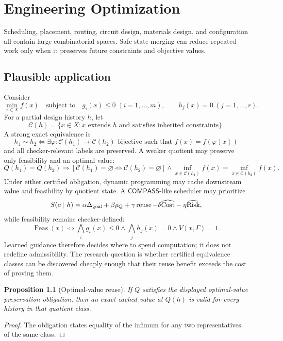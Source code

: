 \documentclass[11pt,oneside]{book}
\newtheorem{proposition}[theorem]{Proposition}
\theoremstyle{definition}
\theoremstyle{remark}
\newcommand{\COMPASS}{\mathsf{COMPASS}}
\newcommand{\Cost}{\operatorname{Cost}}
\newcommand{\Risk}{\operatorname{Risk}}
\begin{document}
\chapter{Engineering Optimization}
\label{ch:engineering}

Scheduling, placement, routing, circuit design, materials design, and configuration all contain large
combinatorial spaces. Safe state merging can reduce repeated work only when it preserves future
constraints and objective values.

\section{Plausible application}
Consider
\[
\min_{x\in X} f(x)
\quad\text{subject to}\quad
g_i(x)\le0\;(i=1,\ldots,m),
\qquad h_j(x)=0\;(j=1,\ldots,r).
\]
For a partial design history \(h\), let
\[
\mathcal C(h)=\{x\in X:x\text{ extends }h\text{ and satisfies inherited constraints}\}.
\]
A strong exact equivalence is
\[
h_1\sim h_2
\iff
\exists\varphi:\mathcal C(h_1)\to\mathcal C(h_2)\text{ bijective such that }
f(x)=f(\varphi(x))
\]
and all checker-relevant labels are preserved. A weaker quotient may preserve only feasibility and an
optimal value:
\[
Q(h_1)=Q(h_2)
\Rightarrow
\left[
\mathcal C(h_1)=\varnothing\iff\mathcal C(h_2)=\varnothing
\right]
\land
\inf_{x\in\mathcal C(h_1)}f(x)=\inf_{x\in\mathcal C(h_2)}f(x).
\]
Under either certified obligation, dynamic programming may cache downstream value and feasibility
by quotient state. A \(\COMPASS\)-like scheduler may prioritize
\[
S(a\mid h)=
\alpha\Delta_{\rm goal}+\beta\rho_Q+\gamma\operatorname{reuse}
-\delta\widehat{\Cost}-\eta\widehat{\Risk},
\]
while feasibility remains checker-defined:
\[
\operatorname{Feas}(x)
\iff
\bigwedge_i g_i(x)\le0
\land\bigwedge_j h_j(x)=0
\land V(x,\Gamma)=1.
\]
Learned guidance therefore decides where to spend computation; it does not redefine admissibility.
The research question is whether certified equivalence classes can be discovered cheaply enough that
their reuse benefit exceeds the cost of proving them.

\begin{proposition}[Optimal-value reuse]
If \(Q\) satisfies the displayed optimal-value preservation obligation, then an exact cached value at
\(Q(h)\) is valid for every history in that quotient class.
\end{proposition}

\begin{proof}
The obligation states equality of the infimum for any two representatives of the same class.
\end{proof}
\end{document}
